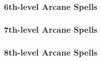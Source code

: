 \subsubsection{6th-level Arcane Spells}
\begin{swspelllist}

    \SLauraofimmunity[Abjur]


    \SLprohibition[Div]
    \SLspellsight
    \SLtrueseeing

    \SLdominateperson[Ench]

    \SLchainlightning[Evoc]
    \SLinferno
    \SLpolarray
    \SLprohibition
    \SLrepulsion
    \SLshadowwall

    \SLshadowwall[Illus]

    \SLdisintegrate[Trans]
    \SLtrueseeing
    \SLtemporalstasis

    \SLfingerofdeath[Vivi]
    \SLharm
    \SLpowerwordblind

    \SLprismaticspray[Univ]

\end{swspelllist}

\subsubsection{7th-level Arcane Spells}
\begin{swspelllist}

    \SLantimagicfield[Abjur]
    \SLavatarofshielding

    \SLavataroftranslocation[Conj]
    \SLicestorm

    \SLscrybolt[Div]

    \SLavataroffealty[Ench]
    \SLdiscordantsong
    \SLfeeblemind

    \SLavatarofwind[Evoc]
    \SLicestorm
    \SLimmolation
    \SLshadowstorm

    \SLshadowstorm[Illus]

    \SLgolemheart[Trans]

    \SLscrybolt[Vivi]
    \SLstriptheflesh

\end{swspelllist}

\subsubsection{8th-level Arcane Spells}
\begin{swspelllist}

    \SLsevermagic[Abjur]

    \SLbladestorm[Conj]
    \SLimprisonment

    \SLshadowduplicate[Div]
    \SLthirdeye

    \SLavatarofsuffering[Ench]

    \SLforcecage[Evoc]

    \SLshadowduplicate[Illus]

    \SLimprisonment[Trans]
    \SLreversegravity

    \SLavatarofdeath[Vivi]
    \SLlifebound

\end{swspelllist}

